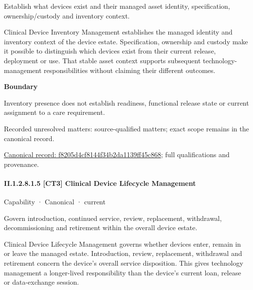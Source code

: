 Establish what devices exist and their managed asset identity, specification, ownership/custody and inventory context.



Clinical Device Inventory Management establishes the managed identity and inventory context of the device estate. Specification, ownership and custody make it possible to distinguish which devices exist from their current release, deployment or use. That stable asset context supports subsequent technology-management responsibilities without claiming their different outcomes.



\textbf{Boundary}



Inventory presence does not establish readiness, functional release state or current assignment to a care requirement.


{\small Recorded unresolved matters: source-qualified matters; exact scope remains in the canonical record.}\par
{\footnotesize \href{../../../../../../../continuum/strategy/capability/f8205d4cf8144f34b2da1139ff45c868.md}{Canonical record: f8205d4cf8144f34b2da1139ff45c868}; full qualifications and provenance.}\par
\paragraph*{II.1.2.8.1.5 [CT3] Clinical Device Lifecycle Management}
\label{navigation:II.1.2.8.1.5}

\label{element:186667f5a3844d10a236af73bc91a0de}
{\small Capability · Canonical · current}\par

Govern introduction, continued service, review, replacement, withdrawal, decommissioning and retirement within the overall device estate.



Clinical Device Lifecycle Management governs whether devices enter, remain in or leave the managed estate. Introduction, review, replacement, withdrawal and retirement concern the device's overall service disposition. This gives technology management a longer-lived responsibility than the device's current loan, release or data-exchange session.



